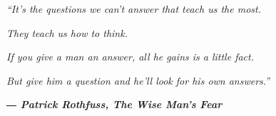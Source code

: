 \begin{dedication}
\textit{``It's the questions we can't answer that teach us the most.}

\textit{They teach us how to think.}

\textit{If you give a man an answer, all he gains is a little fact.} 

\textit{But give him a question and he'll look for his own answers.''}

\textit{\textbf{― Patrick Rothfuss, The Wise Man's Fear}}
\end{dedication}